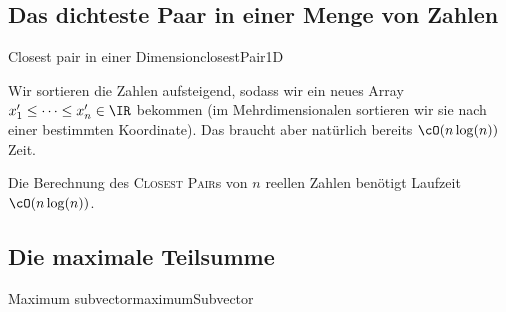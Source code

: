 \documentclass[language=ngerman,algolist,acrolist]{TemplateLecture}
\begin{document}
\subsection{Das dichteste Paar in einer Menge von Zahlen}

 
\begin{prob}{Closest pair in einer Dimension}{closestPair1D}
\end{prob}

Wir sortieren die Zahlen aufsteigend, sodass wir ein neues Array $x_1' \leq  \cdots \leq x_n' \in \IR$ bekommen (im Mehrdimensionalen sortieren wir sie nach einer bestimmten Koordinate). Das braucht aber natürlich bereits $\cO(n \log(n))$ Zeit.

\begin{algorithm}[h]
    \caption{\textsc{FindClosestPair-1D}}
    \begin{algorithmic}[1]
            \EndIf{}
        \EndFor{}
    \end{algorithmic}
\end{algorithm}

\begin{cor}
    Die Berechnung des \textsc{Closest Pair}s von $n$ reellen Zahlen benötigt Laufzeit $\cO(n \log(n))$.
\end{cor}

\subsection{Die maximale Teilsumme}

\begin{prob}{Maximum subvector}{maximumSubvector}
\end{prob}
\end{document}
